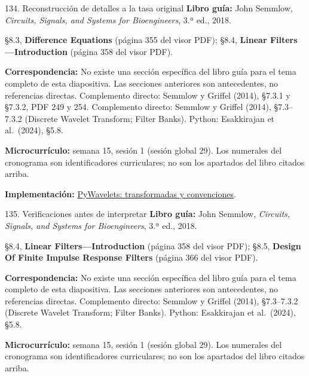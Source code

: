\documentclass[
  10pt,
  ignorenonframetext,
  aspectratio=169,
  spanish,
]{beamer}
\begin{document}
\begin{frame}{134. Reconstrucción de detalles a la tasa original}
\label{reconstrucciuxf3n-de-detalles-a-la-tasa-original}
\textbf{Libro guía:} John Semmlow, \emph{Circuits, Signals, and Systems
for Bioengineers}, 3.ª ed., 2018.

§8.3, \textbf{Difference Equations} (página 355 del visor PDF); §8.4,
\textbf{Linear Filters---Introduction} (página 358 del visor PDF).

\textbf{Correspondencia:} No existe una sección específica del libro
guía para el tema completo de esta diapositiva. Las secciones anteriores
son antecedentes, no referencias directas. Complemento directo: Semmlow
y Griffel (2014), §7.3.1 y §7.3.2, PDF 249 y 254. Complemento directo:
Semmlow y Griffel (2014), §7.3--7.3.2 (Discrete Wavelet Transform;
Filter Banks). Python: Esakkirajan et al.~(2024), §5.8.

\textbf{Microcurrículo:} semana 15, sesión 1 (sesión global 29). Los
numerales del cronograma son identificadores curriculares; no son los
apartados del libro citados arriba.

\textbf{Implementación:}
\href{https://pywavelets.readthedocs.io/en/latest/ref/index.html}{PyWavelets:
transformadas y convenciones}.
\end{frame}

\begin{frame}{135. Verificaciones antes de interpretar}
\label{verificaciones-antes-de-interpretar-8}
\textbf{Libro guía:} John Semmlow, \emph{Circuits, Signals, and Systems
for Bioengineers}, 3.ª ed., 2018.

§8.4, \textbf{Linear Filters---Introduction} (página 358 del visor PDF);
§8.5, \textbf{Design Of Finite Impulse Response Filters} (página 366 del
visor PDF).

\textbf{Correspondencia:} No existe una sección específica del libro
guía para el tema completo de esta diapositiva. Las secciones anteriores
son antecedentes, no referencias directas. Complemento directo: Semmlow
y Griffel (2014), §7.3--7.3.2 (Discrete Wavelet Transform; Filter
Banks). Python: Esakkirajan et al.~(2024), §5.8.

\textbf{Microcurrículo:} semana 15, sesión 1 (sesión global 29). Los
numerales del cronograma son identificadores curriculares; no son los
apartados del libro citados arriba.
\end{frame}
\end{document}
